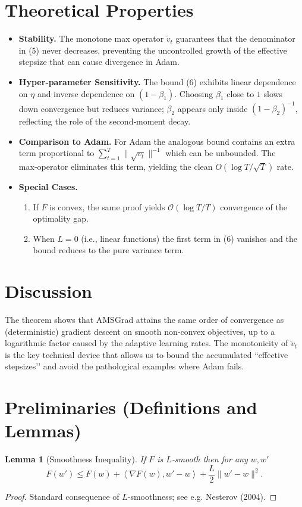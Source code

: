 \documentclass{article}
\newtheorem{lemma}{Lemma}
\newcommand{\ip}[2]{\left\langle #1,#2\right\rangle}
\begin{document}
\section*{Theoretical Properties}
\begin{itemize}[leftmargin=*]
\item \textbf{Stability.} The monotone max operator $\tilde v_t$ guarantees that the denominator in (5) never decreases, preventing the uncontrolled growth of the effective stepsize that can cause divergence in Adam.
\item \textbf{Hyper‑parameter Sensitivity.} The bound (6) exhibits linear dependence on $\eta$ and inverse dependence on $(1-\beta_1)$. Choosing $\beta_1$ close to $1$ slows down convergence but reduces variance; $\beta_2$ appears only inside $(1-\beta_2)^{-1}$, reflecting the role of the second‑moment decay.
\item \textbf{Comparison to Adam.} For Adam the analogous bound contains an extra term proportional to $\sum_{t=1}^{T}\|\sqrt{v_t}\|^{-1}$ which can be unbounded. The max‑operator eliminates this term, yielding the clean $O(\log T/\sqrt{T})$ rate.
\item \textbf{Special Cases.}
    \begin{enumerate}
    \item If $F$ is convex, the same proof yields $\mathcal{O}(\log T/T)$ convergence of the optimality gap.
    \item When $L=0$ (i.e., linear functions) the first term in (6) vanishes and the bound reduces to the pure variance term.
    \end{enumerate}
\end{itemize}

\section*{Discussion}
The theorem shows that AMSGrad attains the same order of convergence as (deterministic) gradient descent on smooth non‑convex objectives, up to a logarithmic factor caused by the adaptive learning rates. The monotonicity of $\tilde v_t$ is the key technical device that allows us to bound the accumulated “effective stepsizes’’ and avoid the pathological examples where Adam fails.

\newpage
\section*{Preliminaries (Definitions and Lemmas)}
\begin{lemma}[Smoothness Inequality]\label{lem:smooth}
If $F$ is $L$‑smooth then for any $w,w'$
\[
F(w')\le F(w) + \ip{\nabla F(w)}{w'-w} + \frac{L}{2}\|w'-w\|^2 .
\]
\end{lemma}
\begin{proof}
Standard consequence of $L$‑smoothness; see e.g. Nesterov (2004). \hfill\qedhere
\end{proof}
\end{document}
